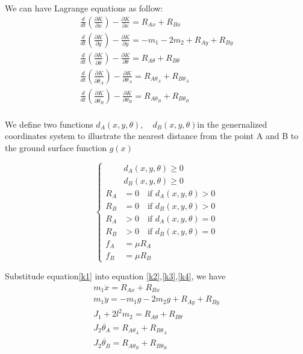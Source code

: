 \documentclass[12 pt]{article}
\begin{document}
We can have Lagrange equations as follow:
\begin{eqnarray}
&\frac{d}{dt}(\frac{\partial K}{\partial \dot{x}})-\frac{\partial K}{\partial x}=R_{Ax}+R_{Bx}& \label{k2} \\
&\frac{d}{dt}(\frac{\partial K}{\partial \dot{y}})-\frac{\partial K}{\partial y}=-m_1-2m_2+R_{Ay}+R_{By}& \label{k3} \\
&\frac{d}{dt}(\frac{\partial K}{\partial \dot{\theta}})-\frac{\partial K}{\partial \theta}=R_{A\theta}+R_{B\theta}& \\ \label{k4}
&\frac{d}{dt}(\frac{\partial K}{\partial \dot{\theta_A}})-\frac{\partial K}{\partial \theta_A}=R_{A\theta_A}+R_{B\theta_A}&\\
&\frac{d}{dt}(\frac{\partial K}{\partial \dot{\theta_B}})-\frac{\partial K}{\partial \theta_B}=R_{A\theta_B}+R_{B\theta_B}&\\
\end{eqnarray}

We define two functions $d_A(x,y,\theta), \quad d_B(x,y,\theta)$in the genernalized coordinates system to illustrate the nearest distance from the point A and B to the ground surface function $g(x)$

\begin{equation}
  \left\{
   \begin{aligned}
   &d_A(x,y,\theta)\ge 0\\
   &d_B(x,y,\theta)\ge0 \\
   R_A&=0 \quad \text{if $d_A(x,y,\theta)>0$}\\
   R_B&=0 \quad \text{if $d_B(x,y,\theta)>0$} \\
   R_A&>0 \quad \text{if $d_A(x,y,\theta)=0$}\\
   R_B&>0 \quad \text{if $d_B(x,y,\theta)=0$}\\
   f_A&=\mu R_A\\
   f_B&=\mu R_B 
   \end{aligned}
  \right.
  \end{equation}

Substitude equation\ref{k1} into equation \ref{k2},\ref{k3},\ref{k4}, we have 
\begin{eqnarray}
&m_1\ddot{x}=R_{Ax}+R_{Bx}& \\
&m_1\ddot{y}=-m_1g-2m_2g+R_{Ay}+R_{By}&\\
&J_1+2l^2m_2=R_{A\theta}+R_{B\theta}&\\
&J_2\ddot{\theta_A}=R_{A\theta_A}+R_{B\theta_A}&\\
&J_2\ddot{\theta_B}=R_{A\theta_B}+R_{B\theta_B}&
\end{eqnarray}
\end{document}
